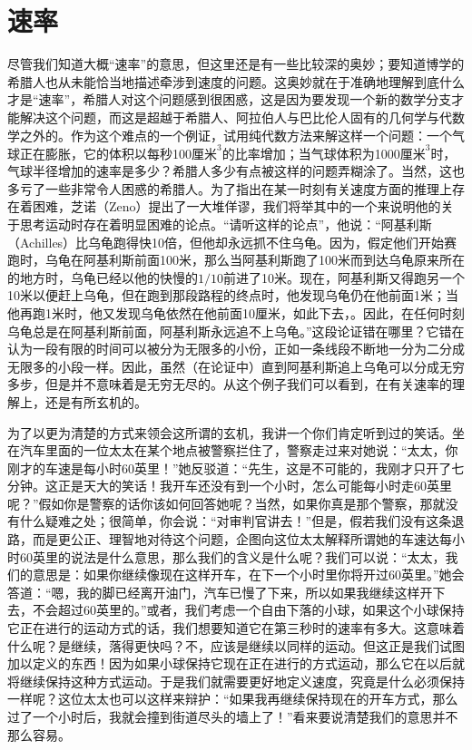 \section{速率}

尽管我们知道大概“速率”的意思，但这里还是有一些比较深的奥妙；要知道博学的希腊人也从未能恰当地描述牵涉到速度的问题。这奥妙就在于准确地理解到底什么才是“速率”，希腊人对这个问题感到很困惑，这是因为要发现一个新的数学分支才能解决这个问题，而这是超越于希腊人、阿拉伯人与巴比伦人固有的几何学与代数学之外的。作为这个难点的一个例证，试用纯代数方法来解这样一个问题：一个气球正在膨胀，它的体积以每秒100$\text{厘米}^3$的比率增加；当气球体积为1000$\text{厘米}^3$时，气球半径增加的速率是多少？希腊人多少有点被这样的问题弄糊涂了。当然，这也多亏了一些非常令人困惑的希腊人。为了指出在某一时刻有关速度方面的推理上存在着困难，芝诺（Zeno）提出了一大堆佯谬，我们将举其中的一个来说明他的关于思考运动时存在着明显困难的论点。“请听这样的论点”，他说：“阿基利斯（Achilles）比乌龟跑得快10倍，但他却永远抓不住乌龟。因为，假定他们开始赛跑时，乌龟在阿基利斯前面100米，那么当阿基利斯跑了100米而到达乌龟原来所在的地方时，乌龟已经以他的快慢的$1/10$前进了10米。现在，阿基利斯又得跑另一个10米以便赶上乌龟，但在跑到那段路程的终点时，他发现乌龟仍在他前面1米；当他再跑1米时，他又发现乌龟依然在他前面10厘米，如此下去，。因此，在任何时刻乌龟总是在阿基利斯前面，阿基利斯永远追不上乌龟。”这段论证错在哪里？它错在认为一段有限的时间可以被分为无限多的小份，正如一条线段不断地一分为二分成无限多的小段一样。因此，虽然（在论证中）直到阿基利斯追上乌龟可以分成无穷多步，但是并不意味着是无穷无尽的。从这个例子我们可以看到，在有关速率的理解上，还是有所玄机的。

为了以更为清楚的方式来领会这所谓的玄机，我讲一个你们肯定听到过的笑话。坐在汽车里面的一位太太在某个地点被警察拦住了，警察走过来对她说：“太太，你刚才的车速是每小时60英里！”她反驳道：“先生，这是不可能的，我刚才只开了七分钟。这正是天大的笑话！我开车还没有到一个小时，怎么可能每小时走60英里呢？”假如你是警察的话你该如何回答她呢？当然，如果你真是那个警察，那就没有什么疑难之处；很简单，你会说：“对审判官讲去！”但是，假若我们没有这条退路，而是更公正、理智地对待这个问题，企图向这位太太解释所谓她的车速达每小时60英里的说法是什么意思，那么我们的含义是什么呢？我们可以说：“太太，我们的意思是：如果你继续像现在这样开车，在下一个小时里你将开过60英里。”她会答道：“嗯，我的脚已经离开油门，汽车已慢了下来，所以如果我继续这样开下去，不会超过60英里的。”或者，我们考虑一个自由下落的小球，如果这个小球保持它正在进行的运动方式的话，我们想要知道它在第三秒时的速率有多大。这意味着什么呢？是继续，落得更快吗？不，应该是继续以同样的运动。但这正是我们试图加以定义的东西！因为如果小球保持它现在正在进行的方式运动，那么它在以后就将继续保持这种方式运动。于是我们就需要更好地定义速度，究竟是什么必须保持一样呢？这位太太也可以这样来辩护：“如果我再继续保持现在的开车方式，那么过了一个小时后，我就会撞到街道尽头的墙上了！”看来要说清楚我们的意思并不那么容易。


